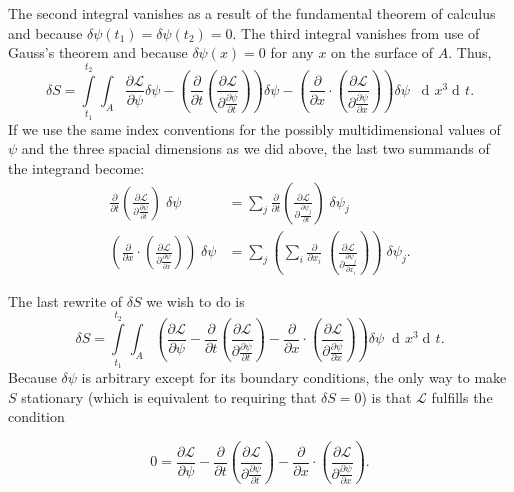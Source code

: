 \documentclass[prb,preprint]{revtex4-1}
\DeclareMathOperator{\dd}{d\!}
\begin{document}
The second integral vanishes as a result of the fundamental theorem of calculus and because $\delta \psi(t_1) = \delta \psi(t_2) = 0$.
The third integral vanishes from use of Gauss's theorem and because $\delta \psi(x) = 0$ for any $x$ on the surface of $A$. Thus,
\begin{equation}
\delta S = \int\limits_{t_1}^{t_2} \int_{A} 
\frac{\partial \mathcal{L}}{\partial \psi} \delta \psi
-\left(\frac{\partial}{\partial t} \left( \frac{\partial \mathcal{L}}{\partial \frac{\partial \psi}{\partial t}} \right)\right) \delta \psi
-\left(\frac{\partial}{\partial x} \cdot \left( \frac{\partial \mathcal{L}}{\partial \frac{\partial \psi}{\partial x}} \right)\right) \delta \psi \;\;
\dd x^3 \dd t.
\end{equation}
If we use the same index conventions for the possibly multidimensional values of $\psi$ and the three spacial dimensions as we did above, the last two summands of the integrand become:
\begin{align}
\frac{\partial}{\partial t} \left( \frac{\partial \mathcal{L}}{\partial \frac{\partial \psi}{\partial t}} \right) \; \delta \psi
&= \sum_j \frac{\partial}{\partial t} \left( \frac{\partial \mathcal{L}}{\partial \frac{\partial \psi_j}{\partial t}} \right) \; \delta \psi_j \\
\left(\frac{\partial}{\partial x} \cdot \left( \frac{\partial \mathcal{L}}{\partial \frac{\partial \psi}{\partial x}} \right)\right) \; \delta \psi
&= \sum_j \left(\sum_i \frac{\partial}{\partial x_i} \; \left( \frac{\partial \mathcal{L}}{\partial \frac{\partial \psi_j}{\partial x_i}} \right)\right) \; \delta \psi_j.
\end{align}

The last rewrite of $\delta S$ we wish to do is
\begin{equation}
\delta S = \int\limits_{t_1}^{t_2} \int_{A} 
\left(
\frac{\partial \mathcal{L}}{\partial \psi}
-\frac{\partial}{\partial t} \left( \frac{\partial \mathcal{L}}{\partial \frac{\partial \psi}{\partial t}} \right) 
-\frac{\partial}{\partial x} \cdot \left( \frac{\partial \mathcal{L}}{\partial \frac{\partial \psi}{\partial x}} \right)\right) \delta \psi \;
\dd x^3 \dd t.
\end{equation}
Because $\delta \psi$ is arbitrary except for its boundary conditions, the only way to make $S$ stationary (which is equivalent to requiring that $\delta S = 0$) is that $\mathcal{L}$ fulfills the condition


\begin{equation}
0 = \frac{\partial \mathcal{L}}{\partial \psi}
-\frac{\partial}{\partial t} \left( \frac{\partial \mathcal{L}}{\partial \frac{\partial \psi}{\partial t}} \right) 
-\frac{\partial}{\partial x} \cdot \left( \frac{\partial \mathcal{L}}{\partial \frac{\partial \psi}{\partial x}} \right).
\end{equation}
\end{document}
